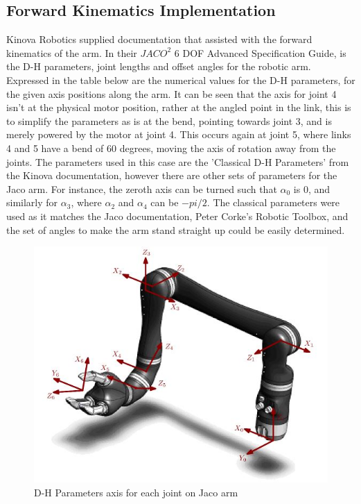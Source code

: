 \documentclass[12pt,openany,a4paper]{book}
\begin{document}
\subsection{Forward Kinematics Implementation}
Kinova Robotics supplied documentation that assisted with the forward kinematics of the arm. In their $JACO^2$ 6 DOF Advanced Specification Guide, is the D-H parameters, joint lengths and offset angles for the robotic arm. Expressed in the table below are the numerical values for the D-H parameters, for the given axis positions along the arm. It can be seen that the axis for joint 4 isn't at the physical motor position, rather at the angled point in the link, this is to simplify the parameters as is at the bend, pointing towards joint 3, and is merely powered by the motor at joint 4. This occurs again at joint 5, where links 4 and 5 have a bend of 60 degrees, moving the axis of rotation away from the joints. The parameters used in this case are the 'Classical D-H Parameters' from the Kinova documentation, however there are other sets of parameters for the Jaco arm. For instance, the zeroth axis can be turned such that $\alpha_0$ is 0, and similarly for $\alpha_3$, where $\alpha_2$ and $\alpha_4$ can be $-pi/2$. The classical parameters were used as it matches the Jaco documentation, Peter Corke's Robotic Toolbox, and the set of angles to make the arm stand straight up could be easily determined. 

\vspace{\baselineskip}

\begin{center}
\begin{figure}[htb]
  \includegraphics[width=0.7\linewidth]{jaco_axis.jpg}
\caption{D-H Parameters axis for each joint on Jaco arm}
\end{figure}
\end{center}
\end{document}

